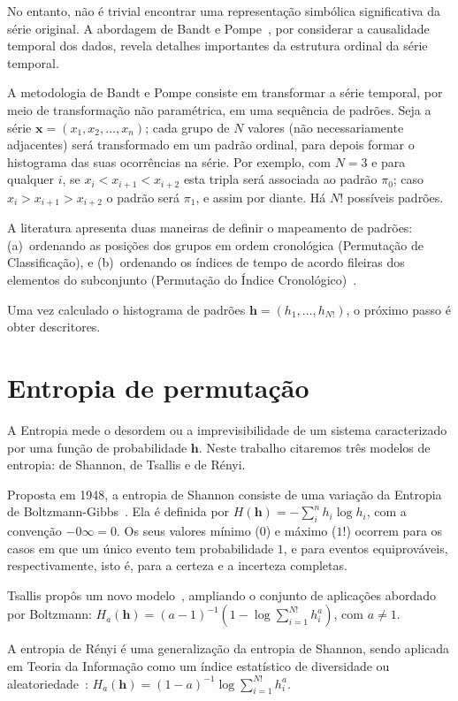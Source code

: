 \documentclass[12pt]{article}
\begin{document}
No entanto, não é trivial encontrar uma representação simbólica significativa da série original. 
A abordagem de Bandt e Pompe~\cite{article2}, por considerar a causalidade temporal dos dados, revela detalhes importantes da estrutura ordinal da série temporal.

A metodologia de Bandt e Pompe consiste em transformar a série temporal, por meio de transformação não paramétrica, em uma sequência de padrões.
Seja a série $\bm x = (x_1, x_2, \dots, x_n)$; cada grupo de $N$ valores (não necessariamente adjacentes) será transformado em um padrão ordinal, para depois formar o histograma das suas ocorrências na série.
Por exemplo, com $N=3$ e para qualquer $i$,
se $x_i<x_{i+1}<x_{i+2}$ esta tripla será associada ao padrão $\pi_0$; 
caso $x_i>x_{i+1}>x_{i+2}$ o padrão será $\pi_1$, e assim por diante.
Há $N!$ possíveis padrões.

A literatura apresenta duas maneiras de definir o mapeamento de padrões:  
(a)~ordenando as posições dos grupos em ordem cronológica (Permutação de Classificação), e 
(b)~ordenando os índices de tempo de acordo fileiras dos elementos do subconjunto (Permutação do Índice Cronológico)~\cite{tiedvalues}.

Uma vez calculado o histograma de padrões $\bm h=(h_1,\dots,h_{N!})$, o próximo passo é obter descritores.

\section{Entropia de permutação}
\label{sec:tres}

A Entropia mede o desordem ou a imprevisibilidade de um sistema caracterizado por uma função de probabilidade $\bm h$.
Neste trabalho citaremos três modelos de entropia: de Shannon, de Tsallis e de R\'enyi.

Proposta em 1948, a entropia de Shannon consiste de uma variação da Entropia de Boltzmann-Gibbs~\cite{shannon}.
Ela é definida por $H(\bm h) = -\sum_{i}^{n} h_i \log h_i $, com a convenção $-0\infty=0$.
Os seus valores mínimo ($0$) e máximo ($1!$) ocorrem para os casos em que um único evento tem probabilidade $1$, e para eventos equiprováveis, respectivamente, isto é, para a certeza e a incerteza completas. 

Tsallis propôs um novo modelo~\cite{entropyInformation}, ampliando o  conjunto de aplicações abordado por Boltzmann:
$H_a(\bm h) ={(a-1)}^{-1}(1 - \log \sum_{i=1}^{N!}h_i^a)$, com $a \neq 1$.

A entropia de R\'enyi é uma generalização da entropia de Shannon, sendo aplicada em Teoria da Informação como um índice estatístico de diversidade ou aleatoriedade~\cite{Tsallis1988}: $H_a(\bm h) ={(1-a)^{-1}}\log \sum_{i=1}^{N!}h_i^a$.
\end{document}

